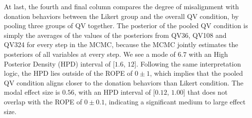 At last, the fourth and final column compares the degree of misalignment with donation behaviors between the Likert group and the overall QV condition, by pooling three groups of QV together. The posterior of the pooled QV condition is simply the averages of the values of the posteriors from QV36, QV108 and QV324 for every step in the MCMC, because the MCMC jointly estimates the posteriors of all variables at every step. We see a mode of $6.7$ with an High Posterior Density (HPD) interval of [$1.6$, $12$]. Following the same interpretation logic, the HPD lies outside of the ROPE of $0 \pm 1$, which implies that the pooled QV condition aligns closer to the donation behaviors than Likert condition. The modal effect size is $0.56$, with an HPD interval of [$0.12$, $1.00$] that does not overlap with the ROPE of $0 \pm 0.1$, indicating a significant medium to large effect size.



